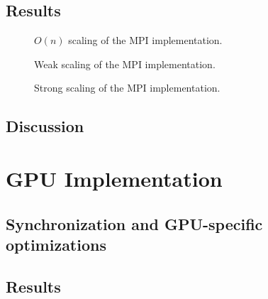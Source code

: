 \documentclass[12pt]{article}
\begin{document}
\subsection{Results}

\begin{figure}
  \caption{$O(n)$ scaling of the MPI implementation.}
  \label{fig:mpi-on}
\end{figure}

\begin{figure}
  \caption{Weak scaling of the MPI implementation.}
  \label{fig:mpi-weak}
\end{figure}

\begin{figure}
  \caption{Strong scaling of the MPI implementation.}
  \label{fig:mpi-strong}
\end{figure}

\subsection{Discussion}





\section{GPU Implementation} \label{GPU}

\subsection{Synchronization and GPU-specific optimizations}

\subsection{Results}
\end{document}
